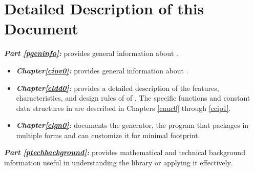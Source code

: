 \section{Detailed Description of this Document}
\label{ciov0:sotd0}

\emph{\textbf{Part \ref{pgeninfo}: \pgeninfolongtitle{}}} provides
general information about \emph{\productbasenameshort{}}.

\begin{itemize}
\item \emph{\textbf{Chapter\postchapterwordnonstretchable{}\ref{ciov0}: 
      \ciovzerolongtitlenoemph{}}} provides general information
      about \emph{\productbasenameshort{}}.  
\item \emph{\textbf{Chapter\postchapterwordnonstretchable{}\ref{cldd0}: 
      \clddzerolongtitlenoemph{}}}
      provides a detailed description 
      of the features, characteristics, and design rules of
      of \emph{\productbasenameshort{}}\@.  The specific
      functions and constant data structures 
      in \emph{\productbasenameshort{}} are described in
      Chapters \ref{cuuc0} through \ref{ccip1}.
\item \emph{\textbf{Chapter\postchapterwordnonstretchable{}\ref{clgn0}: 
      \clgnzerolongtitlenoemph{}}} documents the
      \emph{\productbasenameshort{}} generator, the program that
      packages \emph{\productbasenameshort{}} in multiple forms and
      can customize it for minimal footprint.
\end{itemize}

\emph{\textbf{Part \ref{ptechbackground}: \ptechbackgroundlongtitle{}}}
provides mathematical and technical background information useful in
understanding the library or applying it effectively.

